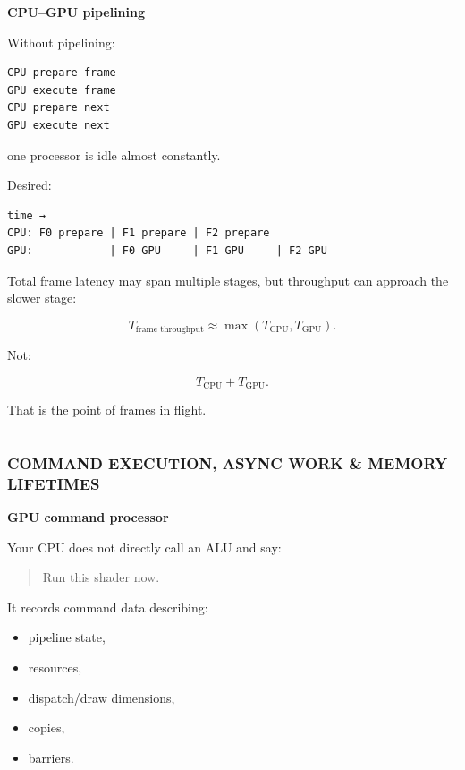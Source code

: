 \textbf{CPU--GPU pipelining}

Without pipelining:

\protect{}\label{p10-serialized}%
\begin{verbatim}
CPU prepare frame
GPU execute frame
CPU prepare next
GPU execute next
\end{verbatim}

one processor is idle almost constantly.

Desired:

\protect{}\label{p10-pipeline}%
\begin{verbatim}
time →
CPU: F0 prepare | F1 prepare | F2 prepare
GPU:            | F0 GPU     | F1 GPU     | F2 GPU
\end{verbatim}

Total frame latency may span multiple stages, but throughput can approach the slower stage:

\[
T_{\text{frame throughput}}
\approx
\max(
T_{\text{CPU}},
T_{\text{GPU}}
).
\]

Not:

\[
T_{\text{CPU}}+T_{\text{GPU}}.
\]

That is the point of frames in flight.

\begin{center}\rule{0.5\linewidth}{0.5pt}\end{center}

\subsubsection{COMMAND EXECUTION, ASYNC WORK \& MEMORY LIFETIMES}\label{05-engine-i-ch019-command-execution-async-work-memory-lifetimes}

\hypertarget{05-engine-i-ch019-command-execution-async-work-memory-lifetimes}{}

\textbf{GPU command processor}

Your CPU does not directly call an ALU and say:

\begin{quote}
Run this shader now.
\end{quote}

It records command data describing:

\begin{itemize}
\tightlist
\item
  pipeline state,
\item
  resources,
\item
  dispatch/draw dimensions,
\item
  copies,
\item
  barriers.
\end{itemize}

